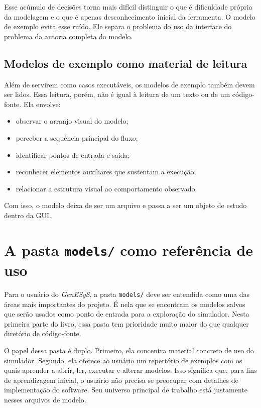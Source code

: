 Esse acúmulo de decisões torna mais difícil distinguir o que é dificuldade própria da modelagem e o que é apenas desconhecimento inicial da ferramenta. O modelo de exemplo evita esse ruído. Ele separa o problema do uso da interface do problema da autoria completa do modelo.

\subsection{Modelos de exemplo como material de leitura}
\label{subsec:cap4_modelos_exemplo_como_leitura}

Além de servirem como casos executáveis, os modelos de exemplo também devem ser lidos. Essa leitura, porém, não é igual à leitura de um texto ou de um código-fonte. Ela envolve:
\begin{itemize}
    \item observar o arranjo visual do modelo;
    \item perceber a sequência principal do fluxo;
    \item identificar pontos de entrada e saída;
    \item reconhecer elementos auxiliares que sustentam a execução;
    \item relacionar a estrutura visual ao comportamento observado.
\end{itemize}

Com isso, o modelo deixa de ser um arquivo e passa a ser um objeto de estudo dentro da GUI.

\section{A pasta \texttt{models/} como referência de uso}
\label{sec:cap4_pasta_models_referencia}

Para o usuário do \textit{GenESyS}, a pasta \texttt{models/} deve ser entendida como uma das áreas mais importantes do projeto. É nela que se encontram os modelos salvos que serão usados como ponto de entrada para a exploração do simulador. Nesta primeira parte do livro, essa pasta tem prioridade muito maior do que qualquer diretório de código-fonte.

O papel dessa pasta é duplo. Primeiro, ela concentra material concreto de uso do simulador. Segundo, ela oferece ao usuário um repertório de exemplos com os quais aprender a abrir, ler, executar e alterar modelos. Isso significa que, para fins de aprendizagem inicial, o usuário não precisa se preocupar com detalhes de implementação do software. Seu universo principal de trabalho está justamente nesses arquivos de modelo.


